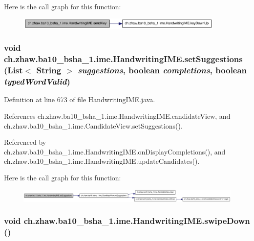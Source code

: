 Here is the call graph for this function:\nopagebreak
\begin{figure}[H]
\begin{center}
\leavevmode
\includegraphics[width=291pt]{classch_1_1zhaw_1_1ba10__bsha__1_1_1ime_1_1HandwritingIME_a2711e357f6251b532e7d0bde79cadfdf_cgraph}
\end{center}
\end{figure}
\hypertarget{classch_1_1zhaw_1_1ba10__bsha__1_1_1ime_1_1HandwritingIME_a761d3a5ee4b8830684c9fe03641b6a62}{
\subsubsection[{setSuggestions}]{\setlength{\rightskip}{0pt plus 5cm}void ch.zhaw.ba10\_\-bsha\_\-1.ime.HandwritingIME.setSuggestions (List$<$ String $>$ {\em suggestions}, \/  boolean {\em completions}, \/  boolean {\em typedWordValid})}}
\label{classch_1_1zhaw_1_1ba10__bsha__1_1_1ime_1_1HandwritingIME_a761d3a5ee4b8830684c9fe03641b6a62}


Definition at line 673 of file HandwritingIME.java.

References ch.zhaw.ba10\_\-bsha\_\-1.ime.HandwritingIME.candidateView, and ch.zhaw.ba10\_\-bsha\_\-1.ime.CandidateView.setSuggestions().

Referenced by ch.zhaw.ba10\_\-bsha\_\-1.ime.HandwritingIME.onDisplayCompletions(), and ch.zhaw.ba10\_\-bsha\_\-1.ime.HandwritingIME.updateCandidates().

Here is the call graph for this function:\nopagebreak
\begin{figure}[H]
\begin{center}
\leavevmode
\includegraphics[width=420pt]{classch_1_1zhaw_1_1ba10__bsha__1_1_1ime_1_1HandwritingIME_a761d3a5ee4b8830684c9fe03641b6a62_cgraph}
\end{center}
\end{figure}
\hypertarget{classch_1_1zhaw_1_1ba10__bsha__1_1_1ime_1_1HandwritingIME_aa35f0cbc95d0b5623c29229e3a8ee2e5}{
\subsubsection[{swipeDown}]{\setlength{\rightskip}{0pt plus 5cm}void ch.zhaw.ba10\_\-bsha\_\-1.ime.HandwritingIME.swipeDown ()}}
\label{classch_1_1zhaw_1_1ba10__bsha__1_1_1ime_1_1HandwritingIME_aa35f0cbc95d0b5623c29229e3a8ee2e5}


